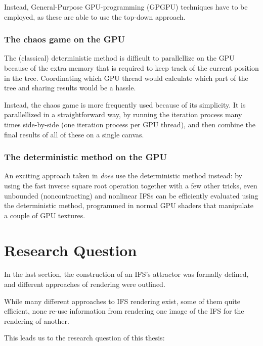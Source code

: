 \documentclass[11pt]{article}
\begin{document}
Instead, General-Purpose GPU-programming (GPGPU) techniques have to be employed, as these are able to use the top-down approach.

\subsubsection{The chaos game on the GPU}
\label{sec:orgdfbed32}
\label{subsection:chaos_game_gpu}

The (classical) deterministic method is difficult to parallellize on the GPU because of the extra memory that is required to keep track of the current position in the tree.
Coordinating which GPU thread would calculate which part of the tree and sharing results would be a hassle.

Instead, the chaos game is more frequently used because of its simplicity. 
It is parallellized in a straightforward way, 
by running the iteration process many times side-by-side (one iteration process per GPU thread),
and then combine the final results of all of these on a single canvas. \cite{green2005gpu}

\subsubsection{The deterministic method on the GPU}
\label{sec:org4bae271}
\label{subsection:deterministic_gpu}

An exciting approach taken in \cite{lawlor2012gpu} \emph{does} use the deterministic method instead:
by using the fast inverse square root operation together with a few other tricks, 
even unbounded (noncontracting) and nonlinear IFSs can be efficiently
evaluated using the deterministic method, programmed in normal GPU shaders that manipulate a couple of GPU textures.

\section{Research Question}
\label{sec:org4e0887c}
\label{section:research_question}

In the last section, the construction of an IFS's attractor was formally defined, 
and different approaches of rendering were outlined.

While many different approaches to IFS rendering exist, some of them quite efficient,
none re-use information from rendering one image of the IFS for the rendering of another.

This leads us to the research question of this thesis:
\end{document}
